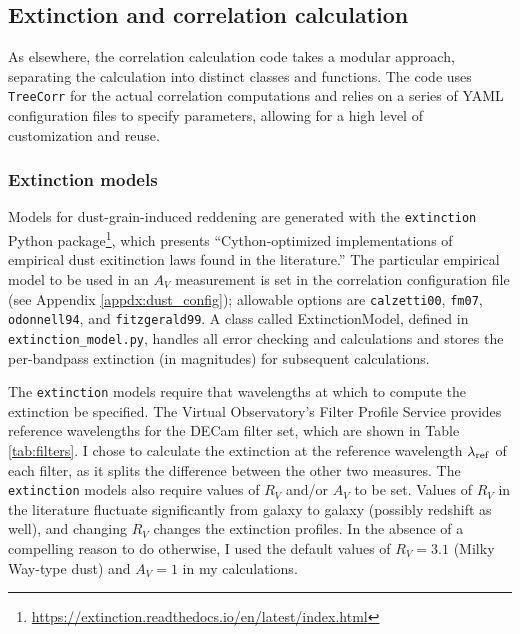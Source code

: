 \documentclass[11pt, oneside]{article}   	%
\begin{document}

\subsection{Extinction and correlation calculation}
As elsewhere, the correlation calculation code takes a modular approach, separating the calculation into distinct classes and functions. The code uses \texttt{TreeCorr} for the actual correlation computations and relies on a series of YAML configuration files to specify parameters, allowing for a high level of customization and reuse.

\subsubsection{Extinction models}
Models for dust-grain-induced reddening are generated with the \texttt{extinction} Python package\footnote{\url{https://extinction.readthedocs.io/en/latest/index.html}}, which presents ``Cython-optimized implementations of empirical dust exitinction laws found in the literature.'' The particular empirical model to be used in an $A_V$ measurement is set in the correlation configuration file (see Appendix \ref{appdx:dust_config}); allowable options are \texttt{calzetti00}, \texttt{fm07}, \texttt{odonnell94}, and \texttt{fitzgerald99}. A class called ExtinctionModel, defined in \texttt{extinction\_model.py}, handles all error checking and calculations and stores the per-bandpass extinction (in magnitudes) for subsequent calculations.

The \texttt{extinction} models require that wavelengths at which to compute the extinction be specified. The Virtual Observatory's Filter Profile Service provides reference wavelengths for the DECam filter set, which are shown in Table \ref{tab:filters}. I chose to calculate the extinction at the reference wavelength $\lambda_{\rm ref}$ of each filter, as it splits the difference between the other two measures. The \texttt{extinction} models also require values of $R_V$ and/or $A_V$ to be set. Values of $R_V$ in the literature fluctuate significantly from galaxy to galaxy (possibly redshift as well), and changing $R_V$ changes the extinction profiles. In the absence of a compelling reason to do otherwise, I used the default values of $R_V = 3.1$ (Milky Way-type dust) and $A_V = 1$ in my calculations. 
\end{document}
